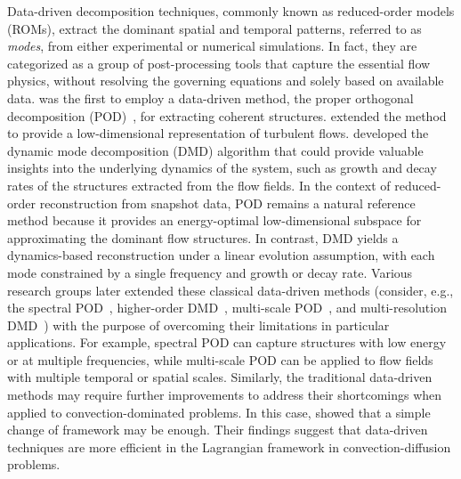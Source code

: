 \documentclass[a4paper,fleqn]{cas-sc}
\begin{document}
	Data-driven decomposition techniques, commonly known as reduced-order models (ROMs), extract the dominant spatial and temporal patterns, referred to as \textit{modes}, from either experimental or numerical simulations. In fact, they are categorized as a group of post-processing tools that capture the essential flow physics, without resolving the governing equations and solely based on available data. \citet{Lumley1967166} was the first to employ a data-driven method, the proper orthogonal decomposition (POD)~\cite{volkwein2013proper,Berkooz1993}, for extracting coherent structures. \citet{Holmes1996} extended the method to provide a low-dimensional representation of turbulent flows. \citet{SCHMID2010} developed the dynamic mode decomposition (DMD) algorithm that could provide valuable insights into the underlying dynamics of the system, such as growth and decay rates of the structures extracted from the flow fields. In the context of reduced-order reconstruction from snapshot data, POD remains a natural reference method because it provides an energy-optimal low-dimensional subspace for approximating the dominant flow structures. In contrast, DMD yields a dynamics-based reconstruction under a linear evolution assumption, with each mode constrained by a single frequency and growth or decay rate. Various research groups later extended these classical data-driven methods (consider, e.g., the spectral POD~\cite{Towne2018}, higher-order DMD~\cite{LeClainche2017}, multi-scale POD~\cite{Mendez2019}, and multi-resolution DMD~\cite{Kutzz2016a}) with the purpose of overcoming their limitations in particular applications. For example, spectral POD can capture structures with low energy or at multiple frequencies, while multi-scale POD can be applied to flow fields with multiple temporal or spatial scales. Similarly, the traditional data-driven methods may require further improvements to address their shortcomings when applied to convection-dominated problems. In this case, \citet{Lu2020} showed that a simple change of framework may be enough. Their findings suggest that data-driven techniques are more efficient in the Lagrangian framework in convection-diffusion problems. 
	
\end{document}
